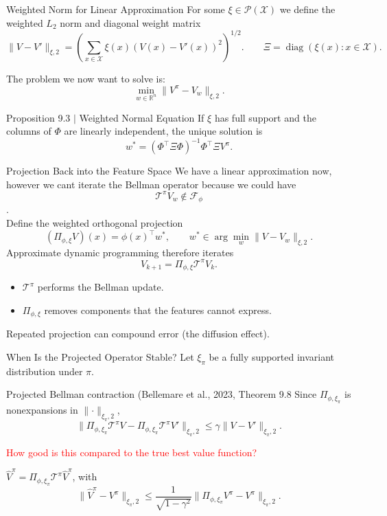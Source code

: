 \documentclass[10pt]{beamer}
\newcommand{\R}{\mathbb{R}}
\newcommand{\Pcal}{\mathcal{P}}
\newcommand{\X}{\mathcal{X}}
\newcommand{\F}{\mathcal{F}}
\newcommand{\T}{\mathcal{T}}
\newcommand{\1}{\mathds{1}}
\newcommand{\norm}[1]{\lVert#1\rVert}
\begin{document}
\begin{frame}{Weighted Norm for Linear Approximation}
  For some $\xi \in \Pcal(\X)$ we define the weighted $L_2$ norm and diagonal weight matrix
  \[
    \norm{V-V'}_{\xi,2}
    =\left(\sum_{x\in\X}\xi(x)(V(x)-V'(x))^2\right)^{1/2}.
    \qquad
    \Xi=\operatorname{diag}(\xi(x):x\in\X).
  \]

  The problem we now want to solve is: 
  $$
    \min_{w\in\R^n}\norm{V^\pi-V_w}_{\xi,2}.
  $$
  \pause
    \begin{block}{Proposition 9.3 $\mid$ Weighted Normal Equation}
    If $\xi$ has full support and the columns of $\Phi$ are linearly
    independent, the unique solution is
    \[
      w^*=(\Phi^\top\Xi\Phi)^{-1}\Phi^\top\Xi V^\pi.
    \]
  \end{block}
\end{frame}

\begin{frame}{Projection Back into the Feature Space}
  We have a linear approximation now, however we cant iterate the Bellman operator because we could have   
  $$\T^\pi V_w \notin \F_\phi$$. \\
  
  Define the weighted orthogonal projection
  \[
    (\Pi_{\phi,\xi}V)(x)=\phi(x)^\top w^*,
    \qquad
    w^*\in\arg\min_w\norm{V-V_w}_{\xi,2}.
  \]
  Approximate dynamic programming therefore iterates
  \[
    V_{k+1}=\Pi_{\phi,\xi}\T^\pi V_k.
  \]
  \begin{itemize}
    \item $\T^\pi$ performs the Bellman update.
    \item $\Pi_{\phi,\xi}$ removes components that the features cannot express.
  \end{itemize}
  Repeated projection can compound error (the diffusion effect).

\end{frame}

\begin{frame}{When Is the Projected Operator Stable?}
  Let $\xi_\pi$ be a fully supported invariant distribution under $\pi$.
  \begin{block}{Projected Bellman contraction (Bellemare et al., 2023, Theorem 9.8}
    Since $\Pi_{\phi,\xi_\pi}$ is nonexpansions in
    $\norm{\cdot}_{\xi_\pi,2}$,
    \[
      \norm{\Pi_{\phi,\xi_\pi}\T^\pi V-
      \Pi_{\phi,\xi_\pi}\T^\pi V'}_{\xi_\pi,2}
      \leq\gamma\norm{V-V'}_{\xi_\pi,2}.
    \]
  \end{block}
  \pause
  \textcolor{red}{How good is this compared to the true best value function?}
  \pause

  $\widehat V^\pi=\Pi_{\phi,\xi_\pi}\T^\pi\widehat V^\pi$, with
  \[
    \norm{\widehat V^\pi-V^\pi}_{\xi_\pi,2}
    \leq\frac{1}{\sqrt{1-\gamma^2}}
    \norm{\Pi_{\phi,\xi_\pi}V^\pi-V^\pi}_{\xi_\pi,2}.
  \]
\end{frame}
\end{document}
